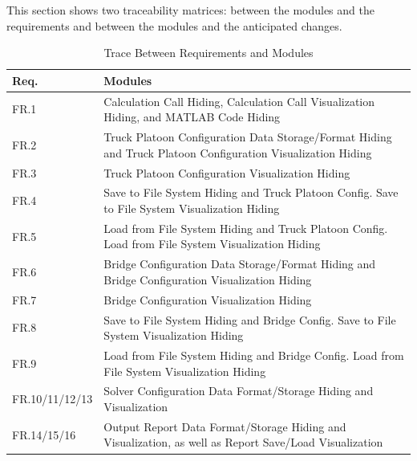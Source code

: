 \documentclass[12pt, titlepage]{article}
\begin{document}
This section shows two traceability matrices: between the modules and the
requirements and between the modules and the anticipated changes.

\begin{table}[H]
\centering
\begin{tabular}{p{} p{}}
\toprule
\textbf{Req.} & \textbf{Modules}\\
\midrule
FR.1 & Calculation Call Hiding, Calculation Call Visualization Hiding, and MATLAB Code Hiding\\
FR.2 & Truck Platoon Configuration Data Storage/Format Hiding and Truck Platoon Configuration Visualization Hiding\\
FR.3 & Truck Platoon Configuration Visualization Hiding\\
FR.4 & Save to File System Hiding and Truck Platoon Config. Save to File System Visualization Hiding\\
FR.5 & Load from File System Hiding and Truck Platoon Config. Load from File System Visualization Hiding\\
FR.6 & Bridge Configuration Data Storage/Format Hiding and Bridge Configuration Visualization Hiding\\
FR.7 & Bridge Configuration Visualization Hiding\\
FR.8 & Save to File System Hiding and Bridge Config. Save to File System Visualization Hiding\\
FR.9 & Load from File System Hiding and Bridge Config. Load from File System Visualization Hiding\\
FR.10/11/12/13 & Solver Configuration Data Format/Storage Hiding and Visualization\\
FR.14/15/16 & Output Report Data Format/Storage Hiding and Visualization, as well as Report Save/Load Visualization\\
\bottomrule
\end{tabular}
\caption{Trace Between Requirements and Modules}
\label{TblRT}
\end{table}
\end{document}
